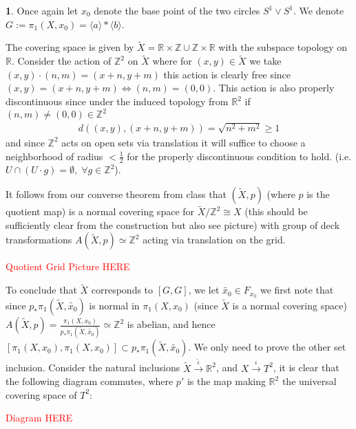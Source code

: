 \documentclass[10.5pt]{article}
\theoremstyle{definition}
\newtheorem{pb}{}
\newcommand{\gen}[1]{\langle #1 \rangle}
\begin{document}
    \begin{pb}
        Once again let \(x_0\) denote the base point of the two circles \(S^1 \vee S^1\). We denote \(G:= \pi_1(X,x_0) = \gen{a}*\gen{b}\).

        The covering space is given by \(\tilde{X} = \mathbb{R} \times \mathbb{Z} \cup \mathbb{Z} \times \mathbb{R}\) with the subspace topology on \(\mathbb{R}\). Consider the action of \(\mathbb{Z}^2\) on \(\tilde{X}\) where for \((x,y) \in \tilde{X}\) we take \((x,y) \cdot(n,m) = (x+n,y+m)\) this action is clearly free since \((x,y) = (x+n,y+m) \iff (n,m) = (0,0)\). This action is also properly discontinuous since under the induced topology from \(\mathbb{R}^2\) if \((n,m) \neq (0,0) \in \mathbb{Z}^2\)
        \begin{align*}
            d\left((x,y), (x+n,y+m) \right) = \sqrt{n^2 + m^2} \geq 1
        \end{align*}
        and since \(\mathbb{Z}^2\) acts on open sets via translation it will suffice to choose a neighborhood of radius \(< \frac12\) for the properly discontinuous condition to hold. (i.e. \(U \cap (U\cdot g) = \emptyset, \; \forall g \in \mathbb{Z}^2\)).

        It follows from our converse theorem from class that \((\tilde{X},p)\) (where \(p\) is the quotient map) is a normal covering space for \(\tilde{X}/\mathbb{Z}^2 \cong X\) (this should be sufficiently clear from the construction but also see picture) with group of deck transformations \(A(\tilde{X},p) \simeq \mathbb{Z}^2\) acting via translation on the grid.

        \textcolor{red}{Quotient Grid Picture HERE}

        To conclude that \(\tilde{X}\) corresponds to \([G,G]\), we let \(\tilde{x_0} \in F_{x_0}\)
        we first note that since \(p_*\pi_1(\tilde{X},\tilde{x_0})\) is normal in \(\pi_1(X,x_0)\) (since \(\tilde{X}\) is a normal covering space) \(A(\tilde{X},p) = \frac{\pi_1(X,x_0)}{p_*\pi_1(\tilde{X},\tilde{x_0})} \simeq \mathbb{Z}^2\) is abelian, and hence \([\pi_1(X,x_0),\pi_1(X,x_0)] \subset p_*\pi_1(\tilde{X},\tilde{x_0})\). We only need to prove the other set inclusion. Consider the natural inclusions \(\tilde{X} \overset{\tilde{\iota}}{\to} \mathbb{R}^2\), and \(X \overset{\iota}{\to} T^2\), it is clear that the following diagram commutes, where \(p'\) is the map making \(\mathbb{R}^2\) the universal covering space of \(T^2\):

        \textcolor{red}{Diagram HERE}


\end{pb}
\end{document}
